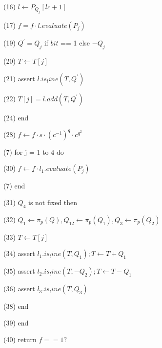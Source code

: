 (16) \indent \indent  $\displaystyle l \leftarrow P_{Q_j}[lc+1] $ \newline

(17) \indent \indent  $\displaystyle f = f \cdot l.evaluate(P_{j})$ \newline

(19) \indent \indent  $\displaystyle Q^{'} = Q_j $ if $bit$ == 1 else $\displaystyle -Q_j $ \newline

(20) \indent \indent  $\displaystyle T \leftarrow T[j] $ \newline

(21) \indent \indent  assert $\displaystyle l.is_line(T, Q^{'}) $ \newline

(22) \indent \indent  $\displaystyle T[j] = l.add(T, Q^{'}) $ \newline

(24) \indent  end \newline

(28) \indent  $\displaystyle f \leftarrow f \cdot s \cdot (c^{-1})^q \cdot c^{q^2} $ \newline

(7) \indent \indent for j = 1 to 4 do \newline

(30) \indent \indent $\displaystyle f \leftarrow f \cdot l_1.evaluate(P_{j}) $ \newline

(7) \indent \indent end \newline

(31) \indent \indent $Q_4$ is not fixed then \newline

(32) \indent \indent  $\displaystyle Q_1 \leftarrow \pi_p(Q), Q_12\leftarrow \pi_p(Q_1), Q_3 \leftarrow \pi_p(Q_2) $ \newline

(33) \indent \indent  $\displaystyle T \leftarrow T[j] $ \newline

(34) \indent \indent  assert $\displaystyle l_1.is_line(T, Q_1); T \leftarrow T + Q_1 $ \newline

(35) \indent \indent  assert $\displaystyle l_2.is_line(T, -Q_2); T \leftarrow T - Q_1 $ \newline

(36) \indent \indent  assert $\displaystyle l_3.is_line(T, Q_3) $ \newline

(38) \indent end \newline

(39) end \newline

(40) return $\displaystyle f == 1? $ \newline